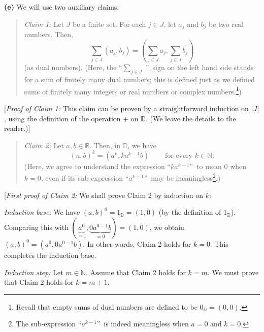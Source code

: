 \documentclass[paper=a4, fontsize=12pt]{scrartcl}%
\let\sumnonlimits\sum
\renewcommand{\sum}{\sumnonlimits\limits}
\theoremstyle{plainsl}
\theoremstyle{definition}
\theoremstyle{remark}
\newenvironment{statement}{\begin{quote}}{\end{quote}}
\begin{document}
\textbf{(e)} We will use two auxiliary claims:

\begin{statement}
\textit{Claim 1:} Let $J$ be a finite set. For each $j\in J$, let $a_{j}$ and
$b_{j}$ be two real numbers. Then,%
\[
\sum_{j\in J}\left(  a_{j},b_{j}\right)  =\left(  \sum_{j\in J}a_{j}%
,\sum_{j\in J}b_{j}\right)
\]
(as dual numbers). (Here, the \textquotedblleft$\sum_{j\in J}$%
\textquotedblright\ sign on the left hand side stands for a sum of finitely
many dual numbers; this is defined just as we defined sums of finitely many
integers or real numbers or complex numbers.\footnote{Recall that empty sums
of dual numbers are defined to be $0_{\mathbb{D}}=\left(  0,0\right)  $.})
\end{statement}

[\textit{Proof of Claim 1:} This claim can be proven by a straightforward
induction on $\left\vert J\right\vert $, using the definition of the operation
$+$ on $\mathbb{D}$. (We leave the details to the reader.)]

\begin{statement}
\textit{Claim 2:} Let $a,b\in\mathbb{R}$. Then, in $\mathbb{D}$, we have%
\[
\left(  a,b\right)  ^{k}=\left(  a^{k},ka^{k-1}b\right)
\ \ \ \ \ \ \ \ \ \ \text{for every }k\in\mathbb{N}.
\]
(Here, we agree to understand the expression \textquotedblleft$ka^{k-1}%
$\textquotedblright\ to mean $0$ when $k=0$, even if its sub-expression
\textquotedblleft$a^{k-1}$\textquotedblright\ may be meaningless\footnote{The
sub-expression \textquotedblleft$a^{k-1}$\textquotedblright\ is indeed
meaningless when $a=0$ and $k=0$.}.)
\end{statement}

[\textit{First proof of Claim 2:} We shall prove Claim 2 by induction on $k$:

\textit{Induction base:} We have $\left(  a,b\right)  ^{0}=1_{\mathbb{D}%
}=\left(  1,0\right)  $ (by the definition of $1_{\mathbb{D}}$). Comparing
this with $\left(  \underbrace{a^{0}}_{=1},\underbrace{0a^{0-1}b}_{=0}\right)
=\left(  1,0\right)  $, we obtain $\left(  a,b\right)  ^{0}=\left(
a^{0},0a^{0-1}b\right)  $. In other words, Claim 2 holds for $k=0$. This
completes the induction base.

\textit{Induction step:} Let $m\in\mathbb{N}$. Assume that Claim 2 holds for
$k=m$. We must prove that Claim 2 holds for $k=m+1$.
\end{document}
